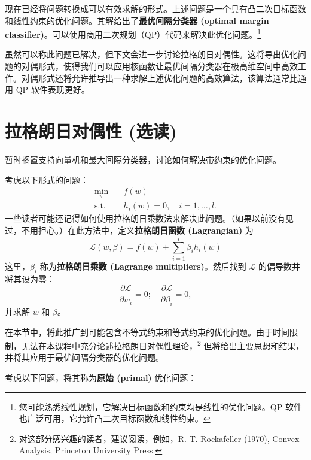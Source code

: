 现在已经将问题转换成可以有效求解的形式。上述问题是一个具有凸二次目标函数和线性约束的优化问题。其解给出了\textbf{最优间隔分类器 (optimal margin classifier)}。可以使用商用二次规划（QP）代码来解决此优化问题。\footnote{您可能熟悉线性规划，它解决目标函数和约束均是线性的优化问题。QP 软件也广泛可用，它允许凸二次目标函数和线性约束。}

虽然可以称此问题已解决，但下文会进一步讨论拉格朗日对偶性。这将导出优化问题的对偶形式，使得我们可以应用核函数让最优间隔分类器在极高维空间中高效工作。对偶形式还将允许推导出一种求解上述优化问题的高效算法，该算法通常比通用 QP 软件表现更好。

\section{拉格朗日对偶性 (选读)}

暂时搁置支持向量机和最大间隔分类器，讨论如何解决带约束的优化问题。

考虑以下形式的问题：
\begin{align*}
    \min_w \quad &f(w)\\
    \text{s.t.} \quad &h_i(w)=0,\quad i=1,\dots,l.
\end{align*}
一些读者可能还记得如何使用拉格朗日乘数法来解决此问题。（如果以前没有见过，不用担心。）在此方法中，定义\textbf{拉格朗日函数 (Lagrangian)} 为
\[
    \mathcal{L}(w, \beta) = f(w) + \sum_{i=1}^l \beta_i h_i(w)
\]
这里，$\beta_i$ 称为\textbf{拉格朗日乘数 (Lagrange multipliers)}。然后找到 $\mathcal{L}$ 的偏导数并将其设为零：
\[
    \frac{\partial \mathcal{L}}{\partial w_i} = 0; \quad \frac{\partial \mathcal{L}}{\partial \beta_i} = 0,
\]
并求解 $w$ 和 $\beta$。

在本节中，将此推广到可能包含不等式约束和等式约束的优化问题。由于时间限制，无法在本课程中充分论述拉格朗日对偶性理论，\footnote{对这部分感兴趣的读者，建议阅读，例如，R. T. Rockafeller (1970), Convex Analysis, Princeton University Press.} 但将给出主要思想和结果，并将其应用于最优间隔分类器的优化问题。

考虑以下问题，将其称为\textbf{原始 (primal)} 优化问题：

